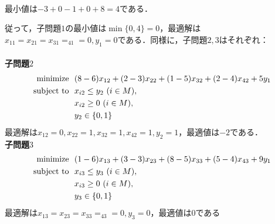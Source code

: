 \documentclass[a4paper,11pt]{jsarticle}
\numberwithin{theorem}{section}  %
\numberwithin{equation}{section} %
\newcommand{\minimize}{\mathop{\mathrm{\rm minimize}}\limits}
\begin{document}
\begin{enumerate}
\begin{itemize}
\[\begin{split}
\end{split}\]
最小値は$-3+0-1+0+8=4$である．
\end{itemize}
従って，子問題$1$の最小値は$\min \{ 0,4 \} = 0$，最適解は$x_{11}=x_{21}=x_{31}=_{41}=0,y_1=0$である．同様に，子問題$2,3$はそれぞれ：\\\\
{\bf 子問題$2$}
\[
\begin{split}
\minimize &\,\,\,\, (8-6)x_{12} + (2-3)x_{22} + (1-5)x_{32} + (2-4)x_{42} +5y_1\\
\text{subject to} &\,\,\,\,  x_{i2} \le y_2 \,\, (i \in M),\\
&\,\,\,\,  x_{i2} \ge 0  \,\, (i \in M),\\
&\,\,\,\,  y_2 \in \{0,1\}
\end{split}
\]
最適解は$x_{12}=0,x_{22}=1,x_{32}=1,x_{42}=1,y_2=1$，最適値は$-2$である．\\

{\bf 子問題$3$}
\[
\begin{split}
\minimize &\,\,\,\, (1-6)x_{13} + (3-3)x_{23} + (8-5)x_{33} + (5-4)x_{43} +9y_1\\
\text{subject to} &\,\,\,\,  x_{i3} \le y_3 \,\, (i \in M),\\
&\,\,\,\,  x_{i3} \ge 0  \,\, (i \in M),\\
&\,\,\,\,  y_3 \in \{0,1\}
\end{split}
\]
最適解は$x_{13}=x_{23}=x_{33}=_{43}=0,y_3=0$，最適値は$0$である\\


\end{enumerate}
\end{document}
